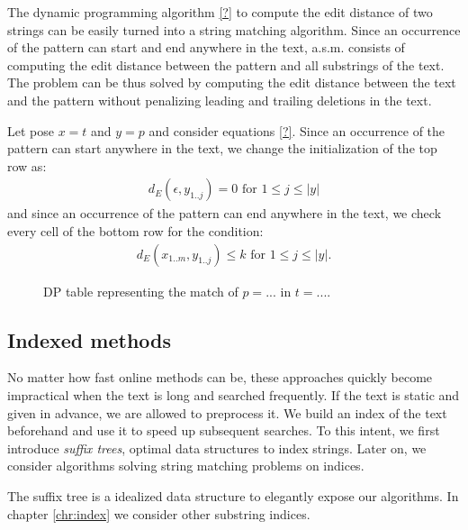 The dynamic programming algorithm \ref{?} to compute the edit distance of two strings can be easily turned into a string matching algorithm.
Since an occurrence of the pattern can start and end anywhere in the text, a.s.m. consists of computing the edit distance between the pattern and all substrings of the text.
The problem can be thus solved by computing the edit distance between the text and the pattern without penalizing leading and trailing deletions in the text.

Let pose $x=t$ and $y=p$ and consider equations \ref{?}.
Since an occurrence of the pattern can start anywhere in the text, we change the initialization of the top row as:
\begin{eqnarray}
d_E(\epsilon, y_{1..j}) = 0 \text{ for } 1 \leq j \leq | y |
\end{eqnarray}
and since an occurrence of the pattern can end anywhere in the text, we check every cell of the bottom row for the condition:
\begin{eqnarray}
d_E(x_{1..m},y_{1..j}) \leq k \text{ for } 1 \leq j \leq | y |.
\end{eqnarray}

\begin{figure}[h]
\caption{DP table representing the match of $p=...$ in $t=...$.}
\label{fig:asm-dp}
\end{figure}





\subsection{Indexed methods}

No matter how fast online methods can be, these approaches quickly become impractical when the text is long and searched frequently.
If the text is static and given in advance, we are allowed to preprocess it.
We build an index of the text beforehand and use it to speed up subsequent searches.
To this intent, we first introduce \emph{suffix trees}, optimal data structures to index strings.
Later on, we consider algorithms solving string matching problems on indices.

The suffix tree is a idealized data structure to elegantly expose our algorithms. In chapter \ref{chr:index} we consider other substring indices.

